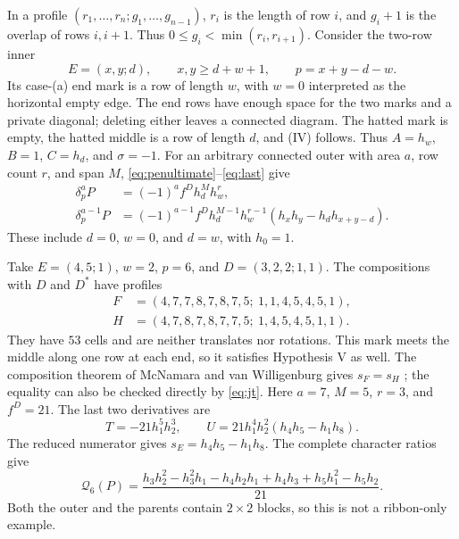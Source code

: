 \documentclass[11pt,a4paper]{amsart}
\numberwithin{equation}{section}
\theoremstyle{plain}
\theoremstyle{definition}
\begin{document}
In a profile \((r_1,\ldots,r_n;g_1,\ldots,g_{n-1})\), \(r_i\) is the length of row \(i\), and \(g_i+1\) is the overlap of rows \(i,i+1\).  Thus \(0\le g_i<\min(r_i,r_{i+1})\).  Consider the two-row inner
\begin{equation}\label{eq:two-row-mark}
 E=(x,y;d),\qquad x,y\ge d+w+1,\qquad p=x+y-d-w.
\end{equation}
Its case-(a) end mark is a row of length \(w\), with \(w=0\) interpreted as the horizontal empty edge.  The end rows have enough space for the two marks and a private diagonal; deleting either leaves a connected diagram.  The hatted mark is empty, the hatted middle is a row of length \(d\), and (IV) follows.  Thus
\(A=h_w\), \(B=1\), \(C=h_d\), and \(\sigma=-1\).
For an arbitrary connected outer with area \(a\), row count \(r\), and span \(M\), \eqref{eq:penultimate}--\eqref{eq:last} give
\begin{align}
 \delta_p^a P&=(-1)^a f^D h_d^M h_w^r,
 \label{eq:two-row-last}\\
 \delta_p^{a-1}P&=(-1)^{a-1}f^D h_d^{M-1}h_w^{r-1}
             (h_xh_y-h_dh_{x+y-d}).
 \label{eq:two-row-previous}
\end{align}
These include \(d=0\), \(w=0\), and \(d=w\), with \(h_0=1\).

Take \(E=(4,5;1)\), \(w=2\), \(p=6\), and \(D=(3,2,2;1,1)\).  The compositions with \(D\) and \(D^*\) have profiles
\begin{align*}
 F&=(4,7,7,8,7,8,7,5;\ 1,1,4,5,4,5,1),\\
 H&=(4,7,8,7,8,7,7,5;\ 1,4,5,4,5,1,1).
\end{align*}
They have \(53\) cells and are neither translates nor rotations.  This mark meets the middle along one row at each end, so it satisfies Hypothesis V as well.  The composition theorem of McNamara and van Willigenburg gives \(s_F=s_H\) \cite[Thm.~3.31]{McNamara2009Classification}; the equality can also be checked directly by \eqref{eq:jt}.  Here \(a=7\), \(M=5\), \(r=3\), and \(f^D=21\).  The last two derivatives are
\begin{equation}\label{eq:example-tail}
 T=-21h_1^5h_2^3,\qquad
 U=21h_1^4h_2^2(h_4h_5-h_1h_8).
\end{equation}
The reduced numerator gives \(s_E=h_4h_5-h_1h_8\).  The complete character ratios give
\begin{equation}\label{eq:example-outer}
 \mathcal Q_6(P)=\frac{h_3h_2^2-h_3^2h_1-h_4h_2h_1+h_4h_3+h_5h_1^2-h_5h_2}{21}.
\end{equation}
Both the outer and the parents contain \(2\times2\) blocks, so this is not a ribbon-only example.
\end{document}
